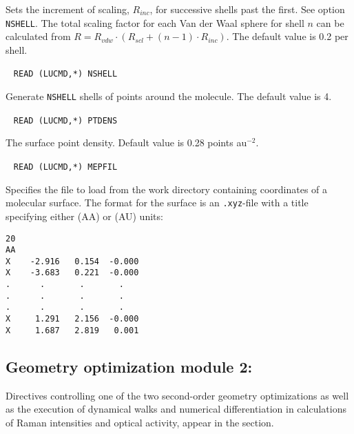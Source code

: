 \begin{description}
Sets the increment of scaling, $R_{inc}$, for successive shells past the first. See option \verb|NSHELL|. The total scaling factor for each Van der Waal sphere for shell $n$ can be calculated from $R = R_{vdw}\cdot (R_{scl}+(n-1)\cdot R_{inc})$. The default value is 0.2 \angstrom{} per shell.

\item[\Key{NSHELL}]\verb| |\newline
\verb|READ (LUCMD,*) NSHELL|

Generate \verb|NSHELL| shells of points around the molecule. The default value is 4.

\item[\Key{PTDENS}]\verb| |\newline
\verb|READ (LUCMD,*) PTDENS|

The surface point density. Default value is 0.28 points au$^{-2}$.

\item[\Key{MEPFIL}]\verb| |\newline
\verb|READ (LUCMD,*) MEPFIL|

Specifies the file to load from the work directory containing coordinates of a molecular surface.
The format for the surface is an \verb|.xyz|-file with a title specifying either \angstrom{} (AA) or \bohr{} (AU) units:
\begin{verbatim}
20
AA
X    -2.916   0.154  -0.000
X    -3.683   0.221  -0.000
.      .       .       .
.      .       .       .
.      .       .       .
X     1.291   2.156  -0.000
X     1.687   2.819   0.001
\end{verbatim}

\end{description}


\subsection{Geometry optimization module 2: }
\label{sec:abawalk}

Directives controlling one of the two second-order
geometry
optimizations  as well as the
execution of dynamical walks and numerical
differentiation in
calculations of Raman intensities and optical activity,
appear in the  section.

